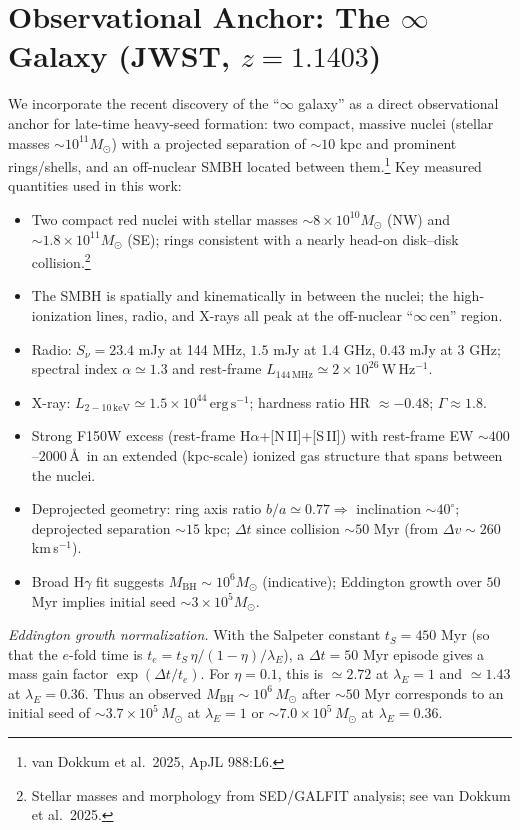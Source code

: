 \documentclass[aps,prd,reprint,onecolumn,nofootinbib]{revtex4-2}
\begin{document}
\section{Observational Anchor: The $\infty$ Galaxy (JWST, $z=1.1403$)}
We incorporate the recent discovery of the ``$\infty$ galaxy'' as a direct observational anchor for late-time heavy-seed formation: two compact, massive nuclei (stellar masses $\sim 10^{11}M_\odot$) with a projected separation of $\sim 10$ kpc and prominent rings/shells, and an off-nuclear SMBH located between them.\footnote{van Dokkum et al.\ 2025, ApJL 988:L6.}
Key measured quantities used in this work:
\begin{itemize}
\item Two compact red nuclei with stellar masses $\sim 8\times 10^{10}M_\odot$ (NW) and $\sim 1.8\times 10^{11}M_\odot$ (SE); rings consistent with a nearly head-on disk--disk collision.\footnote{Stellar masses and morphology from SED/GALFIT analysis; see van Dokkum et al.\ 2025.}
\item The SMBH is spatially and kinematically in between the nuclei; the high-ionization lines, radio, and X-rays all peak at the off-nuclear ``$\infty$\,cen'' region.
\item Radio: $S_\nu=23.4$ mJy at 144 MHz, $1.5$ mJy at 1.4 GHz, $0.43$ mJy at 3 GHz; spectral index $\alpha\simeq 1.3$ and rest-frame $L_{144\,\mathrm{MHz}}\simeq 2\times 10^{26}\,\mathrm{W\,Hz^{-1}}$.
\item X-ray: $L_{2-10\,\mathrm{keV}}\simeq 1.5\times 10^{44}\,\mathrm{erg\,s^{-1}}$; hardness ratio HR $\approx -0.48$; $\Gamma\approx 1.8$.
\item Strong F150W excess (rest-frame H$\alpha$+[N\,II]+[S\,II]) with rest-frame EW $\sim 400$--$2000$\,\AA\ in an extended (kpc-scale) ionized gas structure that spans between the nuclei.
\item Deprojected geometry: ring axis ratio $b/a\simeq 0.77 \Rightarrow$ inclination $\sim 40^\circ$; deprojected separation $\sim 15$ kpc; $\Delta t$ since collision $\sim 50$ Myr (from $\Delta v \sim 260$ km\,s$^{-1}$).
\item Broad H$\gamma$ fit suggests $M_\mathrm{BH}\sim 10^6 M_\odot$ (indicative); Eddington growth over $50$ Myr implies initial seed $\sim 3\times 10^5 M_\odot$.
\end{itemize}

\noindent\emph{Eddington growth normalization.} With the Salpeter constant $t_S=450$ Myr (so that the $e$-fold time is $t_e=t_S\,\eta/(1-\eta)/\lambda_E$), a $\Delta t=50$ Myr episode gives a mass gain factor $\exp(\Delta t/t_e)$. For $\eta=0.1$, this is $\simeq 2.72$ at $\lambda_E=1$ and $\simeq 1.43$ at $\lambda_E=0.36$. Thus an observed $M_\mathrm{BH}\sim10^6\,M_\odot$ after $\sim 50$ Myr corresponds to an initial seed of $\sim 3.7\times10^5\,M_\odot$ at $\lambda_E=1$ or $\sim 7.0\times10^5\,M_\odot$ at $\lambda_E=0.36$.
\end{document}
